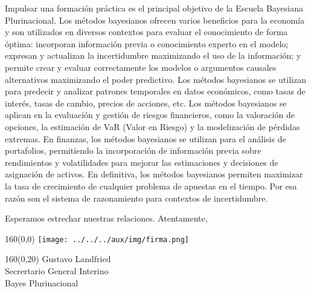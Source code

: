\documentclass[a4paper,10pt]{letter}
\begin{document}
\begin{letter}
\hspace{1cm} Impulsar una formación práctica es el principal objetivo de la Escuela Bayesiana Plurinacional.
%
Los métodos bayesianos ofrecen varios beneficios para la economía y son utilizados en diversos contextos para evaluar el conocimiento de forma óptima: incorporan información previa o conocimiento experto en el modelo; expresan y actualizan la incertidumbre maximizando el uso de la información; y permite crear y evaluar correctamente los modelos o argumentos causales alternativos maximizando el poder predictivo.
%
Los métodos bayesianos se utilizan para predecir y analizar patrones temporales en datos económicos, como tasas de interés, tasas de cambio, precios de acciones, etc.
%
Los métodos bayesianos se aplican en la evaluación y gestión de riesgos financieros, como la valoración de opciones, la estimación de VaR (Valor en Riesgo) y la modelización de pérdidas extremas.
%
En finanzas, los métodos bayesianos se utilizan para el análisis de portafolios, permitiendo la incorporación de información previa sobre rendimientos y volatilidades para mejorar las estimaciones y decisiones de asignación de activos.
%
En definitiva, los métodos bayesianos permiten maximizar la tasa de crecimiento de cualquier problema de apuestas en el tiempo.
%
Por esa razón son el sistema de razonamiento para contextos de incertidumbre.


\hspace{1cm}
Esperamos estrechar nuestras relaciones. Atentamente,

\vspace{.3cm}

\begin{textblock}{160}(0,0)
\phantom{.} \hfill \texttt{[image: ../../../aux/img/firma.png]}\hspace{2cm}\phantom{.} \\[0cm]
\end{textblock}
\begin{textblock}{160}(0,20)
 \phantom{.} \hfill Gustavo Landfried \hspace{2.5cm}\phantom{.}\\ \small
\phantom{.} \hfill Secrertario General Interino \hspace{2.5cm}\phantom{.}\\
\phantom{.} \hfill Bayes Plurinacional \hspace{2.5cm}\phantom{.}\\
\end{textblock}


\end{letter}
\end{document}
